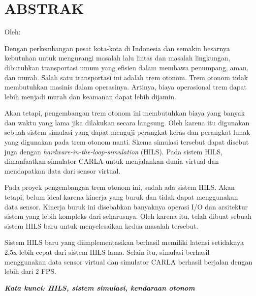 \chapter*{ABSTRAK}

\begin{center}
	\bfseries \MakeUppercase{\thetitle}

	\normalfont\normalsize
	Oleh:

	\theauthor
\end{center}

\begin{singlespace}
	Dengan perkembangan pesat kota-kota di Indonesia dan semakin besarnya
	kebutuhan untuk mengurangi masalah lalu lintas dan masalah lingkungan,
	dibutuhkan transportasi umum yang efisien dalam membawa penumpang, aman, dan
	murah. Salah satu transportasi ini adalah trem otonom. Trem otonom tidak
	membutuhkan masinis dalam operasinya. Artinya, biaya operasional trem dapat
	lebih menjadi murah dan keamanan dapat lebih dijamin.

	Akan tetapi, pengembangan trem otonom ini membutuhkan biaya yang banyak dan
	waktu yang lama jika dilakukan secara langsung. Oleh karena itu digunakan
	sebuah sistem simulasi yang dapat menguji perangkat keras dan
	perangkat lunak yang digunakan pada trem otonom nanti. Skema simulasi
	tersebut dapat disebut juga dengan \textit{hardware-in-the-loop-simulation}
	(HILS). Pada sistem HILS, dimanfaatkan simulator CARLA untuk menjalankan
	dunia virtual dan mendapatkan data dari sensor virtual.

	Pada proyek pengembangan trem otonom ini, sudah ada sistem HILS. Akan
	tetapi, belum ideal karena kinerja yang buruk dan tidak dapat menggunakan
	data sensor. Kinerja buruk ini disebabkan banyaknya operasi I/O dan
	arsitektur sistem yang lebih kompleks dari seharusnya. Oleh karena itu,
	telah dibuat sebuah sistem HILS baru untuk menyelesaikan kedua masalah
	tersebut.

	Sistem HILS baru yang diimplementasikan berhasil memiliki latensi setidaknya
	2,5x lebih cepat dari sistem HILS lama. Selain itu, simulasi berhasil
	menggunakan data sensor virtual dan simulator CARLA berhasil berjalan dengan
	lebih dari 2 FPS.

	\textbf{\textit{Kata kunci: HILS, sistem simulasi, kendaraan otonom}}
\end{singlespace}
\clearpage